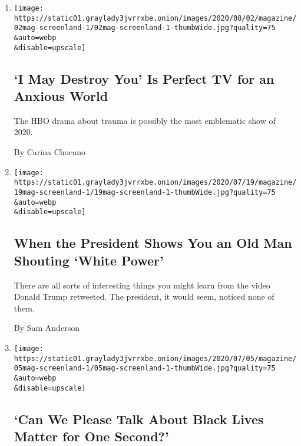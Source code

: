 \begin{enumerate}
\def\labelenumi{\arabic{enumi}.}
\item
  \href{/2020/07/29/magazine/i-may-destroy-you-hbo-michaela-coel.html}{}

  \texttt{[image: https://static01.graylady3jvrrxbe.onion/images/2020/08/02/magazine/02mag-screenland-1/02mag-screenland-1-thumbWide.jpg?quality=75\\\&auto=webp\\\&disable=upscale]}

  \hypertarget{i-may-destroy-you-is-perfect-tv-for-an-anxious-world}{%
  \subsection{`I May Destroy You' Is Perfect TV for an Anxious
  World}\label{i-may-destroy-you-is-perfect-tv-for-an-anxious-world}}

  The HBO drama about trauma is possibly the most emblematic show of
  2020.

  By Carina Chocano
\item
  \href{/2020/07/15/magazine/trump-white-power-tweet.html}{}

  \texttt{[image: https://static01.graylady3jvrrxbe.onion/images/2020/07/19/magazine/19mag-screenland-1/19mag-screenland-1-thumbWide.jpg?quality=75\\\&auto=webp\\\&disable=upscale]}

  \hypertarget{when-the-president-shows-you-an-old-man-shouting-white-power}{%
  \subsection{When the President Shows You an Old Man Shouting `White
  Power'}\label{when-the-president-shows-you-an-old-man-shouting-white-power}}

  There are all sorts of interesting things you might learn from the
  video Donald Trump retweeted. The president, it would seem, noticed
  none of them.

  By Sam Anderson
\item
  \href{/2020/07/02/magazine/can-we-please-talk-about-black-lives-matter-for-one-second.html}{}

  \texttt{[image: https://static01.graylady3jvrrxbe.onion/images/2020/07/05/magazine/05mag-screenland-1/05mag-screenland-1-thumbWide.jpg?quality=75\\\&auto=webp\\\&disable=upscale]}

  \hypertarget{can-we-please-talk-about-black-lives-matter-for-one-second}{%
  \subsection{`Can We Please Talk About Black Lives Matter for One
  Second?'}\label{can-we-please-talk-about-black-lives-matter-for-one-second}}


\end{enumerate}
